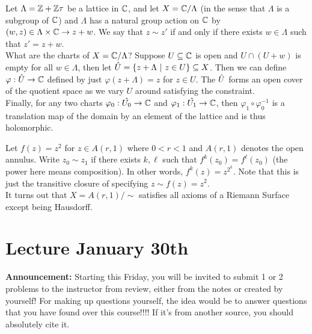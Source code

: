 \documentclass{article}
\begin{document}
\begin{example}
    Let $\Lambda = \mathbb{Z} + \mathbb{Z} \tau$ be a lattice in $\mathbb{C}$, and let $X = \mathbb{C}/\Lambda$ (in the sense that $\Lambda$ is a subgroup of $\mathbb{C}$) and $\Lambda$ has a natural group action on $\mathbb{C}$ by $(w, z) \in \Lambda \times \mathbb{C} \to z + w$. We say that $z \sim z'$ if and only if there exists $w \in \Lambda$ such that $z' = z + w$.\\

    What are the charts of $X = \mathbb{C}/\Lambda$? Suppose $U \subseteq \mathbb{C}$ is open and $U \cap (U + w)$ is empty for all $w \in \Lambda$, then let $\Hat{U} = \{z + \Lambda\ |\ z \in U\} \subseteq X$. Then we can define $\varphi: \Hat{U} \to \mathbb{C}$ defined by just $\varphi(z + \Lambda) = z$ for $z \in U$. The $\Hat{U}$ forms an open cover of the quotient space as we vary $U$ around satisfying the constraint.\\

    Finally, for any two charts $\varphi_0: \Hat{U_0} \to \mathbb{C}$ and $\varphi_1: \Hat{U_1} \to \mathbb{C}$, then $\varphi_1 \circ \varphi_0^{-1}$ is a translation map of the domain by an element of the lattice and is thus holomorphic.
\end{example}

\begin{example}
    Let $f(z) = z^2$ for $z \in A(r, 1)$ where $0 < r < 1$ and $A(r, 1)$ denotes the open annulus. Write $z_0 \sim z_1$ if there exists $k, \ell$ such that $f^k(z_0) = f^\ell(z_0)$ (the power here means composition). In other words, $f^k(z) = z^{2^k}$. Note that this is just the transitive closure of specifying $z \sim f(z) = z^2$.\\

    It turns out that $X = A(r, 1)/\sim$ satisfies all axioms of a Riemann Surface except being Hausdorff.
\end{example}

\newpage
\section{Lecture January 30th}

\textbf{Announcement:} Starting this Friday, you will be invited to submit 1 or 2 problems to the instructor from review, either from the notes or created by yourself! For making up questions yourself, the idea would be to answer questions that you have found over this course!!!! If it's from another source, you should absolutely cite it.
\end{document}
